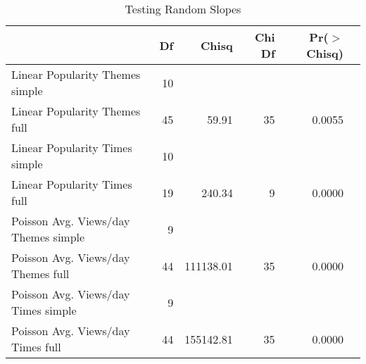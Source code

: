 \begin{table}[ht]
	   \caption{Testing Random Slopes} 
	\label{anova}
\centering
\begin{tabular}{lrrrrr}
  \hline
 & Df & Chisq & Chi Df & Pr($>$Chisq) \\ 
  \hline
Linear Popularity Themes simple & 10 &  &  &  \\ 
Linear Popularity Themes full & 45 & 59.91 & 35 & 0.0055 \\ 
Linear Popularity Times simple & 10 &  &  &  \\ 
Linear Popularity Times full & 19 & 240.34 & 9 & 0.0000 \\ 
Poisson Avg. Views/day Themes simple & 9 &  &  &  \\ 
Poisson Avg. Views/day Themes full & 44 & 111138.01 & 35 & 0.0000 \\ 
Poisson Avg. Views/day Times simple & 9 &  &  &  \\ 
Poisson Avg. Views/day Times full & 44 & 155142.81 & 35 & 0.0000 \\ 
   \hline

\end{tabular}
\end{table}
